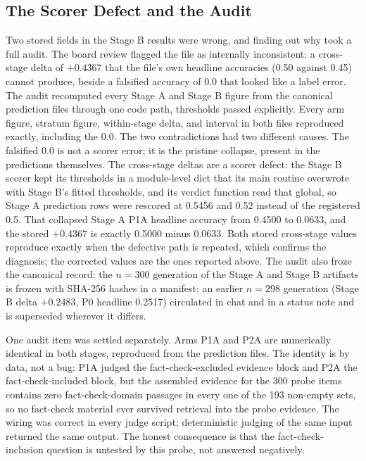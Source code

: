 \documentclass{article} %
\begin{document}
\subsection{The Scorer Defect and the Audit}
\label{sec:scorer}
Two stored fields in the Stage B results were wrong, and finding out why took a full audit. The board review flagged the file as internally inconsistent: a cross-stage delta of \(+0.4367\) that the file's own headline accuracies (0.50 against 0.45) cannot produce, beside a falsified accuracy of 0.0 that looked like a label error. The audit recomputed every Stage A and Stage B figure from the canonical prediction files through one code path, thresholds passed explicitly. Every arm figure, stratum figure, within-stage delta, and interval in both files reproduced exactly, including the 0.0. The two contradictions had two different causes. The falsified 0.0 is not a scorer error; it is the pristine collapse, present in the predictions themselves. The cross-stage deltas are a scorer defect: the Stage B scorer kept its thresholds in a module-level dict that its main routine overwrote with Stage B's fitted thresholds, and its verdict function read that global, so Stage A prediction rows were rescored at 0.5456 and 0.52 instead of the registered 0.5. That collapsed Stage A P1A headline accuracy from 0.4500 to 0.0633, and the stored \(+0.4367\) is exactly 0.5000 minus 0.0633. Both stored cross-stage values reproduce exactly when the defective path is repeated, which confirms the diagnosis; the corrected values are the ones reported above. The audit also froze the canonical record: the \(n=300\) generation of the Stage A and Stage B artifacts is frozen with SHA-256 hashes in a manifest; an earlier \(n=298\) generation (Stage B delta \(+0.2483\), P0 headline 0.2517) circulated in chat and in a status note and is superseded wherever it differs.

One audit item was settled separately. Arms P1A and P2A are numerically identical in both stages, reproduced from the prediction files. The identity is by data, not a bug: P1A judged the fact-check-excluded evidence block and P2A the fact-check-included block, but the assembled evidence for the 300 probe items contains zero fact-check-domain passages in every one of the 193 non-empty sets, so no fact-check material ever survived retrieval into the probe evidence. The wiring was correct in every judge script; deterministic judging of the same input returned the same output. The honest consequence is that the fact-check-inclusion question is untested by this probe, not answered negatively.
\end{document}
